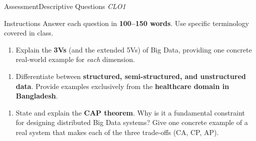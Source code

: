 \documentclass[aspectratio=169,10pt]{beamer}
\begin{document}
\begin{frame}{Assessment\textemdash Descriptive Questions \hfill\small\textit{CLO1}}
  \begin{block}{Instructions}
    Answer each question in \textbf{100--150 words}.  Use specific terminology covered in class.
  \end{block}
  \vspace{10pt}
  \begin{enumerate}[\textbf{D1.}]
    \item Explain the \textbf{3Vs} (and the extended 5Vs) of Big Data, providing one concrete real-world example for \emph{each} dimension.
  \end{enumerate}
  \vspace{8pt}
  \begin{enumerate}[\textbf{D2.}]
    \item Differentiate between \textbf{structured, semi-structured, and unstructured data}.  Provide examples exclusively from the \textbf{healthcare domain in Bangladesh}.
  \end{enumerate}
  \vspace{8pt}
  \begin{enumerate}[\textbf{D3.}]
    \item State and explain the \textbf{CAP theorem}.  Why is it a fundamental constraint for designing distributed Big Data systems?  Give one concrete example of a real system that makes each of the three trade-offs (CA, CP, AP).
  \end{enumerate}
\end{frame}
\end{document}

